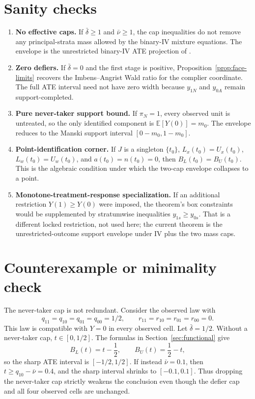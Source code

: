 \documentclass[11pt]{article}
\newcommand{\E}{\mathbb{E}}
\theoremstyle{definition}
\theoremstyle{plain}
\theoremstyle{remark}
\begin{document}
\section{Sanity checks}
\begin{enumerate}[label=(\roman*)]
\item \textbf{No effective caps.}  If \(\bar\delta\ge1\) and
\(\bar\nu\ge1\), the cap inequalities do not remove any principal-strata mass
allowed by the binary-IV mixture equations.  The envelope is the unrestricted
binary-IV ATE projection of \cite{BalkePearl1997}.
\item \textbf{Zero defiers.}  If \(\bar\delta=0\) and the first stage is
positive, Proposition~\ref{prop:face-limits} recovers the Imbens--Angrist Wald
ratio for the complier coordinate.  The full ATE interval need not have zero
width because \(y_{1N}\) and \(y_{0A}\) remain support-completed.
\item \textbf{Pure never-taker support bound.}  If \(\pi_N=1\), every observed
unit is untreated, so the only identified component is \(\E[Y(0)]=m_0\).  The
envelope reduces to the Manski support interval \([0-m_0,1-m_0]\).
\item \textbf{Point-identification corner.}  If \(J\) is a singleton
\(\{t_0\}\), \(L_x(t_0)=U_x(t_0)\), \(L_w(t_0)=U_w(t_0)\), and
\(a(t_0)=n(t_0)=0\), then \(B_L(t_0)=B_U(t_0)\).  This is the algebraic
condition under which the two-cap envelope collapses to a point.
\item \textbf{Monotone-treatment-response specialization.}  If an additional
restriction \(Y(1)\ge Y(0)\) were imposed, the theorem's box constraints would
be supplemented by stratumwise inequalities \(y_{1s}\ge y_{0s}\).  That is a
different locked restriction, not used here; the current theorem is the
unrestricted-outcome support envelope under IV plus the two mass caps.
\end{enumerate}

\section{Counterexample or minimality check}
The never-taker cap is not redundant.  Consider the observed law with
\[
q_{11}=q_{10}=q_{01}=q_{00}=1/2,\qquad
r_{11}=r_{10}=r_{01}=r_{00}=0.
\]
This law is compatible with \(Y=0\) in every observed cell.  Let
\(\bar\delta=1/2\).  Without a never-taker cap, \(t\in[0,1/2]\).  The formulas
in Section~\ref{sec:functional} give
\[
B_L(t)=t-\frac12,\qquad B_U(t)=\frac12-t,
\]
so the sharp ATE interval is \([-1/2,1/2]\).  If instead
\(\bar\nu=0.1\), then \(t\ge q_{10}-\bar\nu=0.4\), and the sharp interval
shrinks to \([-0.1,0.1]\).  Thus dropping the never-taker cap strictly weakens
the conclusion even though the defier cap and all four observed cells are
unchanged.
\end{document}
